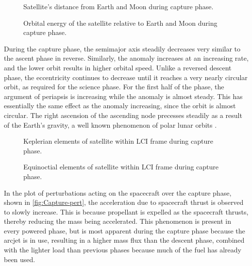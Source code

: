 \begin{figure}
\centering
\def\svgwidth{\figurewidth}

\caption{Satellite's distance from Earth and Moon during capture phase.}
\label{fig:Capture-dist}
\end{figure}

\begin{figure}
\centering
\def\svgwidth{\figurewidth}

\caption{Orbital energy of the satellite relative to Earth and Moon during capture phase.}
\label{fig:Capture-orbeng}
\end{figure}

During the capture phase, the semimajor axis steadily decreases very similar to the ascent phase in reverse. Similarly, the anomaly increases at an increasing rate, and the lower orbit results in higher orbital speed. Unlike a reversed descent phase, the eccentricity continues to decrease until it reaches a very nearly circular orbit, as required for the science phase. For the first half of the phase, the argument of periapsis is increasing while the anomaly is almost steady. This has essentially the same effect as the anomaly increasing, since the orbit is almost circular. The right ascension of the ascending node precesses steadily as a result of the Earth's gravity, a well known phenomenon of polar lunar orbits \parencite{Gupta2011}. %

\begin{figure}
\centering
\def\svgwidth{\figurewidth}

\caption{Keplerian elements of satellite within LCI frame during capture phase.}
\label{fig:Capture-kep-lci}
\end{figure}

\begin{figure}
\centering
\def\svgwidth{\figurewidth}

\caption{Equinoctial elements of satellite within LCI frame during capture phase.}
\label{fig:Capture-mee}
\end{figure}

In the plot of perturbations acting on the spacecraft over the capture phase, shown in \autoref{fig:Capture-pert}, the acceleration due to spacecraft thrust is observed to slowly increase. This is because propellant is expelled as the spacecraft thrusts, thereby reducing the mass being accelerated. This phenomenon is present in every powered phase, but is most apparent during the capture phase because the arcjet is in use, resulting in a higher mass flux than the descent phase, combined with the lighter load than previous phases because much of the fuel has already been used.

